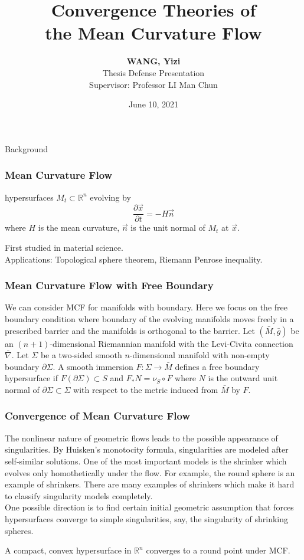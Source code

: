 \documentclass[pdf]{beamer}
\title[Contact: Yizi Wang (yzwang@math.cuhk.edu.hk)]{Convergence Theories of\\ the Mean Curvature Flow}
\subtitle{}
\date[2021]{June 10, 2021}
\author[WANG, Yizi]{\texorpdfstring{\textbf{WANG, Yizi}\\Thesis Defense Presentation\\Supervisor: Professor LI Man Chun}{WANG, Yizi}}
\institute[The Chinese University of Hong Kong]{Department of Mathematics\\The Chinese University of Hong Kong}
\newcommand{\R}{\mathbb{R}}
\begin{document}
\begin{frame}
	\titlepage
\end{frame}

\begin{section}{Background}

    \begin{frame}
        \frametitle{Mean Curvature Flow}
        \begin{definition}
            hypersurfaces $M_t \subset \R^n$ evolving by \[\frac{\partial \vec{x}}{\partial t} =-H \vec{n}\] where $H$ is the mean curvature, $\vec{n}$ is the unit normal of $M_t$ at $\vec{x}$.
        \end{definition}
        
        First studied in material science.\\
        Applications: Topological sphere theorem, Riemann Penrose inequality.
    \end{frame}

    \begin{frame}
        \frametitle{Mean Curvature Flow with Free Boundary}
        We can consider MCF for manifolds with boundary. Here we focus on the free boundary condition where boundary of the evolving manifolds moves freely in a prescribed barrier and the manifolds is orthogonal to the barrier.
        Let $(\bar{M}, \bar{g})$ be an $(n+1)$-dimensional Riemannian manifold with the Levi-Civita connection $\bar{\nabla }$. Let $\Sigma $ be a two-sided smooth $n$-dimensional manifold with non-empty boundary $\partial \Sigma $. A smooth immersion $F \colon \Sigma \to  \bar{M}$ defines a free boundary hypersurface if $F(\partial \Sigma ) \subset S$ and $F_* N = \nu _S \circ F$ where $N$ is the outward unit normal of $\partial \Sigma \subset \Sigma $ with respect to the metric induced from $\bar{M}$ by $F$.
    \end{frame}

    \begin{frame}
        \frametitle{Convergence of Mean Curvature Flow}
        The nonlinear nature of geometric flows leads to the possible appearance of singularities. By Huisken's monotocity formula, singularities are modeled after self-similar solutions. One of the most important models is the shrinker which evolves only homothetically under the flow. For example, the round sphere is an example of shrinkers. There are many examples of shrinkers which make it hard to classify singularity models completely.\\
        One possible direction is to find certain initial geometric assumption that forces hypersurfaces converge to simple singularities, say, the singularity of shrinking spheres.
        \begin{theorem}
            A compact, convex hypersurface in $\R^n$ converges to a round point under MCF.
        \end{theorem}
        

\end{frame}
\end{section}
\end{document}

